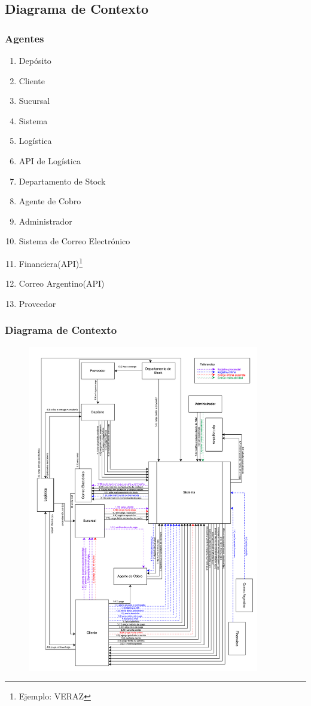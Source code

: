 \subsection{Diagrama de Contexto}

\subsubsection{Agentes}

\begin{enumerate}
  \item Depósito
  \item Cliente
  \item Sucursal
  \item Sistema
  \item Logística
  \item API de Logística
  \item Departamento de Stock
  \item Agente de Cobro
  \item Administrador
  \item Sistema de Correo Electrónico
  \item Financiera(API)\footnote{Ejemplo: VERAZ}
  \item Correo Argentino(API)
  \item Proveedor
\end{enumerate}
\clearpage

\subsubsection{Diagrama de Contexto}

\begin{figure}[H]
  \begin{center}
  \includegraphics[width=0.9\textwidth]{tp1/images/contexto.pdf}
  \end{center}
\end{figure}
